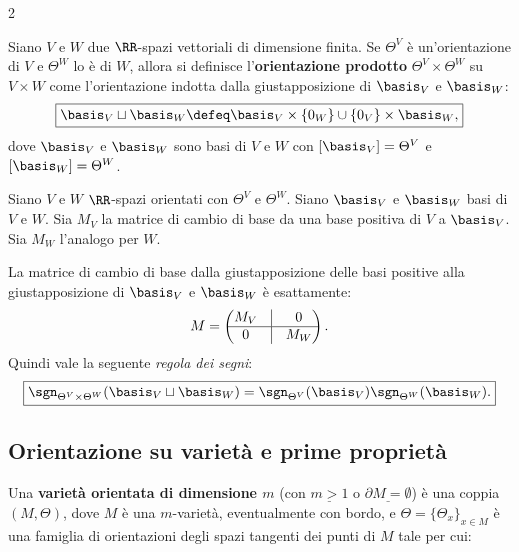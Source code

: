 \begin{multicols*}{2}
    \begin{definition}
        Siano $V$ e $W$ due $\RR$-spazi vettoriali di dimensione finita.
        Se $\Theta^V$ è un'orientazione di $V$ e $\Theta^W$ lo è di $W$,
        allora si definisce l'\textbf{orientazione prodotto} $\Theta^V \times \Theta^W$ su
        $V \times W$ come l'orientazione indotta dalla giustapposizione di $\basis_V$ e $\basis_W$:
        \[ \boxed{\basis_V \sqcup \basis_W \defeq \basis_V \times \{0_W\} \cup \{0_V\} \times \basis_W,} \]
        dove $\basis_V$ e $\basis_W$ sono basi di $V$ e $W$ con
        $[\basis_V] = \Theta^V$ e $[\basis_W] = \Theta^W$.
    \end{definition}

    \begin{remark} \label{rmk:regola_segni}
        Siano $V$ e $W$ $\RR$-spazi orientati con $\Theta^V$ e $\Theta^W$.
        Siano $\basis_V$ e $\basis_W$ basi di $V$ e $W$. Sia $M_V$
        la matrice di cambio di base da una base positiva di $V$ a $\basis_V$. Sia
        $M_W$ l'analogo per $W$. \smallskip

        La matrice di cambio di base dalla giustapposizione delle basi positive alla giustapposizione di $\basis_V$
        e $\basis_W$ è esattamente:
        \[
            M = \begin{pmatrix}
                M_V & \vline & 0   \\
                \hline
                0   & \vline & M_W
            \end{pmatrix}.
        \]
        Quindi vale la seguente \textit{regola dei segni}:
        \[
            \boxed{\sgn_{\Theta^V \times \Theta^W}(\basis_V \sqcup \basis_W) = \sgn_{\Theta^V}(\basis_V) \sgn_{\Theta^W}(\basis_W).}
        \]
    \end{remark}

    \subsection{Orientazione su varietà e prime proprietà}

    \begin{definition}[$m$-varietà orientata, $m > 1$ o $\partial M = \emptyset$]
        Una \textbf{varietà orientata di dimensione $m$} (con $\underline{m>1}$ o $\underline{\partial M = \emptyset}$)
        è una coppia $(M, \Theta)$, dove $M$ è una $m$-varietà, eventualmente con bordo, e $\Theta = \{\Theta_x\}_{x \in M}$
        è una famiglia di orientazioni degli spazi tangenti dei punti di $M$ tale per cui:


\end{definition}
\end{multicols*}
